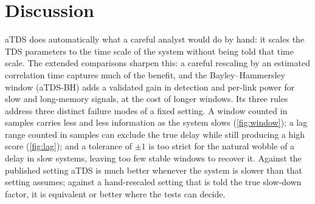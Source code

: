\documentclass[11pt,a4paper]{article}
\begin{document}
\begin{table}[t]
\centering
\caption{Real records under all settings: score \% / $p$ / delay (stable windows of all windows). 200 rotations.}
\label{tab:fields4}
\footnotesize
{}
\end{table}

\section{Discussion}
\label{sec:discussion}
aTDS does automatically what a careful analyst would do by hand: it scales the TDS parameters to the time scale of the system without being told that time scale. The extended comparisons sharpen this: a careful rescaling by an estimated correlation time captures much of the benefit, and the Bayley--Hammersley window (aTDS-BH) adds a validated gain in detection and per-link power for slow and long-memory signals, at the cost of longer windows. Its three rules address three distinct failure modes of a fixed setting. A window counted in samples carries less and less information as the system slows (\cref{fig:window}); a lag range counted in samples can exclude the true delay while still producing a high score (\cref{fig:lag}); and a tolerance of $\pm1$ is too strict for the natural wobble of a delay in slow systems, leaving too few stable windows to recover it. Against the published setting aTDS is much better whenever the system is slower than that setting assumes; against a hand-rescaled setting that is told the true slow-down factor, it is equivalent or better where the tests can decide.
\end{document}
